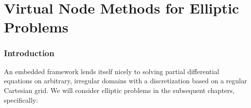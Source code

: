 %

\part{Virtual Node Methods for Elliptic Problems}

\section{Introduction} \label{sec:pt2.Introduction}

An embedded framework lends itself nicely to solving partial differential equations on arbitrary, irregular domains with a discretization based on a regular Cartesian grid. We will consider elliptic problems in the subsequent chapters, specifically:


